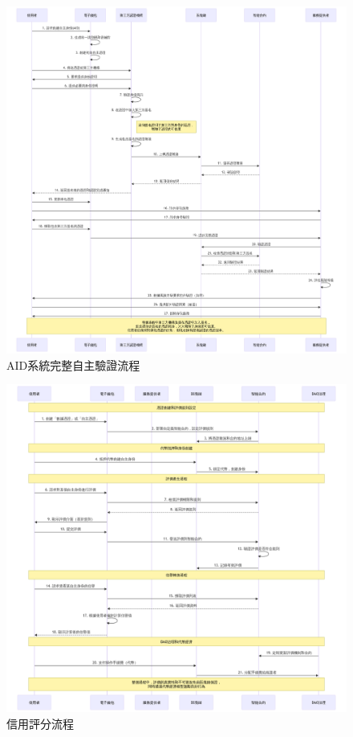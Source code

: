 \begin{figure}[p]
  \centering
  \includegraphics[width=\linewidth]{figures/full-aid-auth.png}
  \caption{AID系統完整自主驗證流程}
  \label{fig:appendix-full-aid-auth}
\end{figure}
\clearpage
\begin{figure}[p]
  \centering
  \includegraphics[width=\linewidth]{figures/credit-uml.png}
  \caption{信用評分流程}
  \label{fig:appendix-credit-uml}
\end{figure}
